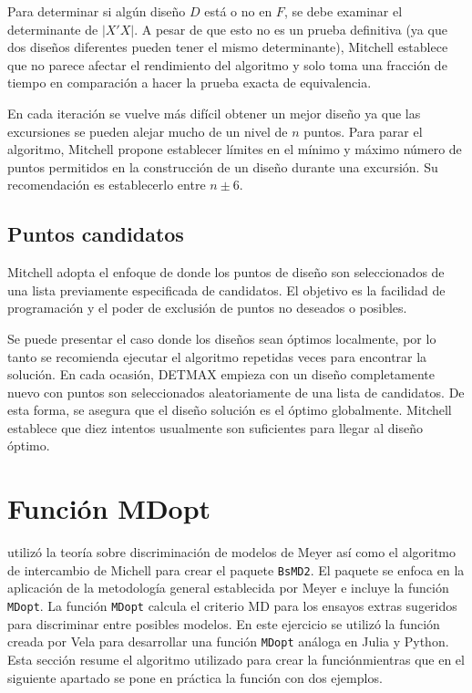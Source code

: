 Para determinar si algún diseño $D$ está o no en $F$, se debe examinar el determinante de $|X'X|$. A pesar de que esto no es un prueba definitiva (ya que dos diseños diferentes pueden tener el mismo determinante), Mitchell establece que no parece afectar el rendimiento del algoritmo y solo toma una fracción de tiempo en comparación a hacer la prueba exacta de equivalencia.

En cada iteración se vuelve más difícil obtener un mejor diseño ya que las excursiones se pueden alejar mucho de un nivel de $n$ puntos. Para parar el algoritmo, Mitchell propone establecer límites en el mínimo y máximo número de puntos permitidos en la construcción de un diseño durante una excursión. Su recomendación es establecerlo entre $n \pm 6$. 

\subsection{Puntos candidatos}

Mitchell adopta el enfoque de \cite{dykstra1971augmentation} donde los puntos de diseño son seleccionados de una lista previamente especificada de candidatos. El objetivo es la facilidad de programación y el poder de exclusión de puntos no deseados o posibles. 

Se puede presentar el caso donde los diseños sean óptimos localmente, por lo tanto se recomienda ejecutar el algoritmo repetidas veces para encontrar la solución. En cada ocasión, DETMAX empieza con un diseño completamente nuevo con puntos son seleccionados aleatoriamente de una lista de candidatos. De esta forma, se asegura que el diseño solución es el óptimo globalmente. Mitchell establece que diez intentos usualmente son suficientes para llegar al diseño óptimo. 

\section{Función MDopt}
\cite{tesis_paty} utilizó la teoría sobre discriminación de modelos de Meyer así como el algoritmo de intercambio de Michell para crear el paquete \texttt{BsMD2}. El paquete se enfoca en la aplicación de la metodología general establecida por Meyer e incluye la función \texttt{MDopt}. La función \texttt{MDopt} calcula el criterio MD para los ensayos extras sugeridos para discriminar entre posibles modelos. En este ejercicio se utilizó la función creada por Vela para desarrollar una función \texttt{MDopt} análoga en \textsf{Julia} y \textsf{Python}. Esta sección resume el algoritmo utilizado para crear la funciónmientras que en el siguiente apartado se pone en práctica la función con dos ejemplos. 

